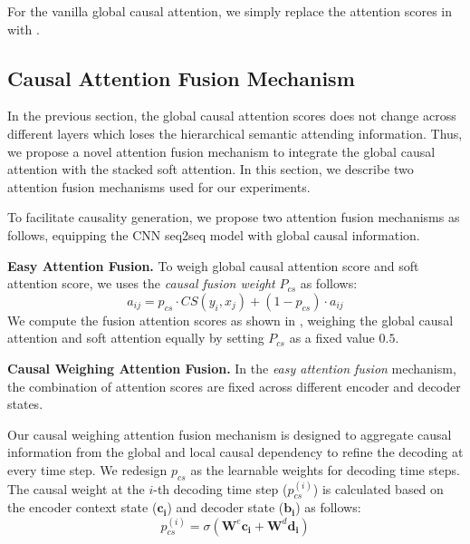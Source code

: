 For the vanilla global causal attention, 
we simply replace the attention scores in  with .

\subsection{Causal Attention Fusion Mechanism}
\label{sec:fusion}
In the previous section, the global causal attention scores does not change across different layers which loses the hierarchical semantic attending information.
Thus, we propose a novel attention fusion mechanism 
to integrate the global causal attention with the stacked soft attention. In this section, we describe two attention fusion mechanisms used for our experiments.

To facilitate causality generation, 
we propose two attention fusion mechanisms as follows,
equipping the CNN seq2seq model with global causal information.

\textbf{Easy Attention Fusion.}
To weigh global causal attention score and soft attention score, we uses the \emph{causal fusion weight} $P_{cs}$  as follows:
\begin{equation}
\label{eq:easy}
a_{ij} = p_{cs} \cdot CS(y_i,x_j) + (1-p_{cs}) \cdot a_{ij}
\end{equation}
We compute the fusion attention scores as shown in , weighing the global causal attention and soft attention equally by setting $P_{cs}$ as a fixed value $0.5$. 

\textbf{Causal Weighing Attention Fusion.} 
In the \emph{easy attention fusion} mechanism, the combination of attention scores are fixed across different encoder and decoder states.

Our causal weighing attention fusion mechanism is designed to aggregate causal information from the global and local causal dependency to refine the decoding at every time step. 
We redesign $p_{cs}$ as the learnable weights for decoding time steps. 
The causal weight at the $i$-th decoding time step ($p^{(i)}_{cs}$) is calculated based on the encoder context state ($\mathbf{c_i}$) and decoder state ($\mathbf{b_i}$) as follows:
\begin{equation}
p^{(i)}_{cs} = \sigma(\mathbf{W}^e\mathbf{c_i} + \mathbf{W}^d\mathbf{d_i}) 
\end{equation}

